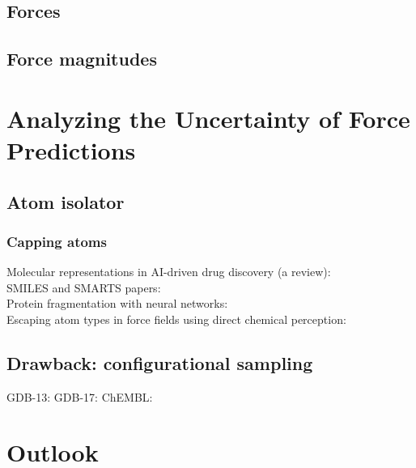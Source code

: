 \subsection{Forces}

\subsection{Force magnitudes}

\section{Analyzing the Uncertainty of Force Predictions}

\subsection{Atom isolator}
\subsubsection{Capping atoms}

Molecular representations in AI-driven drug discovery (a review): \cite{mol_reps_in_AI_drug_discovery_david}\\
SMILES and SMARTS papers: \cite{SMILES_pair_encoding_li, mol_patterns_SMARTS_schmidt, automated_fragment_gen_smiles_bilsland}\\
Protein fragmentation with neural networks: \cite{protein_ff_fragmentation_nn_wang}\\
Escaping atom types in force fields using direct chemical perception: \cite{direct_chem_perception_mobley} \\

\subsection{Drawback: configurational sampling}

GDB-13: \cite{gdb-13}
GDB-17: \cite{gdb-17}
ChEMBL: \cite{ChEMBL_gaulton}

\section{Outlook}